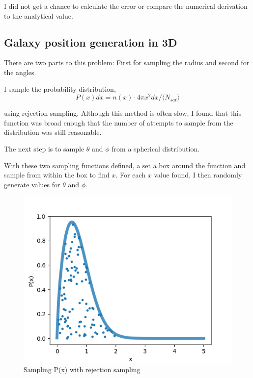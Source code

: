     
    
    

    

    I did not get a chance to calculate the error or compare the numerical derivation to the analytical value.



    \newpage
    \subsection{Galaxy position generation in 3D}

    There are two parts to this problem: First for sampling the radius and second for the angles.

    I sample the probability distribution, 
    \begin{equation}
        P(x) dx  = n(x) \cdot 4 \pi x^2 dx / \langle N_{sat} \rangle
        \label{eq:p(x)}
    \end{equation}

    using rejection sampling. Although this method is often slow, I found that this function was broad enough that the number of attempts to sample from the distribution was still reasonable. 


    


    \newpage
    The next step is to sample $\theta$ and $\phi$ from a spherical distribution. 

    

    
    With these two sampling functions defined, a set a box around the function and sample from within the box to find $x$. For each $x$ value found, I then randomly generate values for $\theta$ and $\phi$.
    
    

    \begin{figure}[H]
        \centering
        \includegraphics[width=.5\textwidth]{output/2d_r-samples.png}
        \caption{Sampling P(x) with rejection sampling}
    \end{figure}



